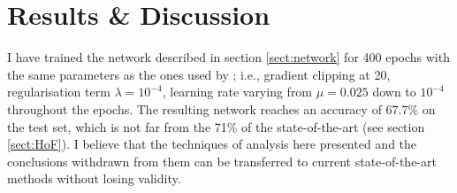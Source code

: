 \chapter{Results \& Discussion} \label{Chapter: Results}





I have trained the network described in section \ref{sect:network} for 400 epochs with the same parameters as the ones used by \cite{Jurtz2017}; i.e., gradient clipping at 20, regularisation term $\lambda=10^{-4}$, learning rate varying from $\mu=0.025$ down to $10^{-4}$ throughout the epochs. The resulting network reaches an accuracy of 67.7\% on the test set, which is not far from the 71\% of the state-of-the-art (see section \ref{sect:HoF}).
I believe that the techniques of analysis here presented and the conclusions withdrawn from them can be transferred to current state-of-the-art methods without losing validity.

